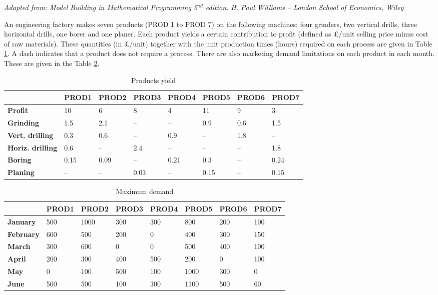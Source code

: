 \textit{
	Adapted from: Model Building in Mathematical Programming 5$^{nd}$ edition.
	H. Paul Williams -- London School of Economics, Wiley}

An engineering factory makes seven products (PROD 1 to PROD 7) on the
following machines: four grinders, two vertical drills, three horizontal drills, one
borer and one planer. Each product yields a certain contribution to profit (defined
as £/unit selling price minus cost of raw materials). These quantities (in £/unit)
together with the unit production times (hours) required on each process are given
in Table \ref{table:prodyield}. A dash indicates that a product does not require a process. There are also marketing demand limitations on each product in each month. These are given in the Table \ref{table:mark}.

\begin{table}[h]
	\begin{tabular}{l|lllllll}
		& \textbf{PROD1} & \textbf{PROD2} & \textbf{PROD3} & \textbf{PROD4} & \textbf{PROD5} & \textbf{PROD6} & \textbf{PROD7} \\ \hline 
		\textbf{Profit} & 10    & 6     & 8     & 4     & 11    & 9     & 3     \\
		\textbf{Grinding}              & 1.5   & 2.1   & –     & –     & 0.9   & 0.6   & 1.5   \\
		\textbf{Vert. drilling}     & 0.3   & 0.6   & –     & 0.9   & –     & 1.8   & –     \\
		\textbf{Horiz. drilling}   & 0.6   & –     & 2.4   & –     & –     & –     & 1.8   \\
		\textbf{Boring}                & 0.15  & 0.09  & –     & 0.21  & 0.3   & –     & 0.24  \\
		\textbf{Planing}               & –     & –     & 0.03  & –     & 0.15  & –     & 0.15 \\ \hline
	\end{tabular}
	\caption{Products yield}
	\label{table:prodyield}
\end{table}



\begin{table}[H]
	\begin{tabular}{l|lllllll}
		& \textbf{PROD1} & \textbf{PROD2} & \textbf{PROD3} & \textbf{PROD4} & \textbf{PROD5} & \textbf{PROD6} & \textbf{PROD7} \\ \hline
		\textbf{January}   & 500   & 1000  & 300   & 300   & 800   & 200   & 100   \\
		\textbf{February}  & 600   & 500   & 200   & 0     & 400   & 300   & 150   \\
		\textbf{March}     & 300   & 600   & 0     & 0     & 500   & 400   & 100   \\
		\textbf{April}     & 200   & 300   & 400   & 500   & 200   & 0     & 100   \\
		\textbf{May}       & 0     & 100   & 500   & 100   & 1000  & 300   & 0     \\
		\textbf{June}      & 500   & 500   & 100   & 300   & 1100  & 500   & 60    \\ \hline
	\end{tabular}
	\caption{Maximum demand}
	\label{table:mark}
\end{table}

